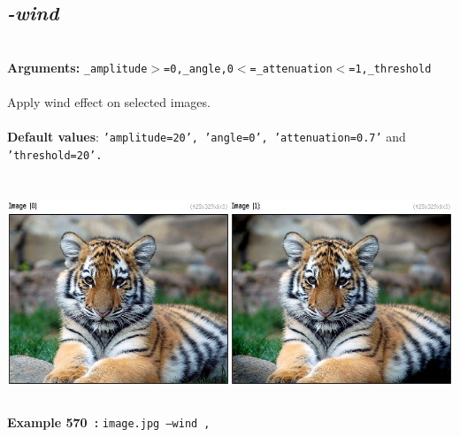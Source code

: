 \documentclass[a4paper,11pt,twoside]{book}
\begin{document}
\subsection{\emph{-wind} }\vspace*{-0.5em}
~\\\textbf{Arguments: } 
{\small \texttt{\_amplitude$>$=0,\_angle,0$<$=\_attenuation$<$=1,\_threshold}}\\~\\
Apply wind effect on selected images.
~\\~\\\textbf{Default values}: {\small \texttt{'amplitude=20', 'angle=0', 'attenuation=0.7'} and \texttt{'threshold=20'.}}
\begin{center}\includegraphics[keepaspectratio=true,height=7cm,width=\textwidth]{img/gmic_def570.jpg}\\
{\footnotesize \textbf{Example 570~:} \texttt{image.jpg --wind ,}}
\end{center}
\end{document}

